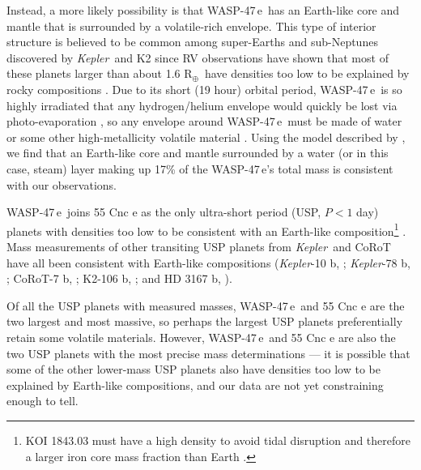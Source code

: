 \documentclass{emulateapj}
\newcommand{\Kepler}{{\it Kepler}}
\newcommand{\ron}{\color{black}}
\newcommand{\thissecondplanet}{WASP-47\,e}
\newcommand{\rearth}{R$_\oplus$}
\begin{document}
Instead, a more likely possibility is that \thissecondplanet\ has an Earth-like core and mantle that is surrounded by a volatile-rich envelope. This type of interior structure is believed to be common among super-Earths and sub-Neptunes discovered by \Kepler\ and K2 since RV observations have shown that most of these planets larger than about 1.6 \rearth\ have densities too low to be explained by rocky compositions {\ron \citep{marcy, weissmarcy, rogers, dressingk93, sinukoffk2106}}. Due to its short (19 hour) orbital period, \thissecondplanet\ is so highly irradiated that any hydrogen/helium envelope would quickly be lost via photo-evaporation \citep{penz2008, sanzforcada, lopez12}, so any envelope around \thissecondplanet\ must be made of water or some other high-metallicity volatile material \citep{lopez}. Using the model described by \citet{lopez}, we find that an Earth-like core and mantle surrounded by a water (or in this case, steam) layer making up 17\% of the \thissecondplanet's total mass is consistent with our observations.


\thissecondplanet\ joins 55 Cnc e as the only ultra-short period (USP, $P<1$ day) planets with densities too low to be consistent with an Earth-like composition\footnote{KOI 1843.03 must have a high density to avoid tidal disruption and therefore a larger iron core mass fraction than Earth \citep{koi1843}.} \citep{sanchisojedausp}. Mass measurements of other transiting USP planets from \Kepler\ and CoRoT have all been consistent with Earth-like compositions  (\Kepler-10 b, \citealt{batalhak10, dumusque, weissk10}; \Kepler-78 b, \citealt{howardk78, pepek78, grunblatt}; CoRoT-7 b, \citealt{queloz, haywood}; K2-106 b, \citealt{sinukoffk2106, guentherk2106}; and HD 3167 b, \citealt{christiansenhd3167, gandolfihd3167}). 

Of all the USP planets with measured masses, \thissecondplanet\ and 55 Cnc e are the two largest and most massive, so perhaps the largest USP planets preferentially retain some volatile materials. However, \thissecondplanet\ and 55 Cnc e are also the two USP planets with the most precise mass determinations --- it is possible that some of the other lower-mass USP planets also have densities too low to be explained by Earth-like compositions, and our data are not yet constraining enough to tell. 
\end{document}
